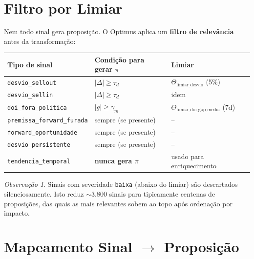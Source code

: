 \documentclass[a4paper, 12pt]{report}
\theoremstyle{definition}
\theoremstyle{remark}
\newtheorem{observacao}{Observa\c{c}\~ao}[chapter]
\begin{document}
\section{Filtro por Limiar}

Nem todo sinal gera proposi\c{c}\~ao. O Optimus aplica um
\textbf{filtro de relev\^ancia} antes da transforma\c{c}\~ao:

\begin{center}
\begin{tabular}{lll}
  \toprule
  \textbf{Tipo de sinal} & \textbf{Condi\c{c}\~ao para gerar $\pi$} & \textbf{Limiar} \\
  \midrule
  \texttt{desvio\_sellout} & $|\Delta| \geq \tau_d$ & $\Theta_{\text{limiar\_desvio}}$ (5\%) \\
  \texttt{desvio\_sellin} & $|\Delta| \geq \tau_d$ & idem \\
  \texttt{doi\_fora\_politica} & $|g| \geq \gamma_m$ & $\Theta_{\text{limiar\_doi\_gap\_media}}$ (7d) \\
  \texttt{premissa\_forward\_furada} & sempre (se presente) & -- \\
  \texttt{forward\_oportunidade} & sempre (se presente) & -- \\
  \texttt{desvio\_persistente} & sempre (se presente) & -- \\
  \texttt{tendencia\_temporal} & \textbf{nunca gera $\pi$} & usado para enriquecimento \\
  \bottomrule
\end{tabular}
\end{center}

\begin{observacao}
  Sinais com severidade \texttt{baixa} (abaixo do limiar) s\~ao descartados
  silenciosamente. Isto reduz $\sim$3.800 sinais para tipicamente
  centenas de proposi\c{c}\~oes, das quais as mais relevantes sobem
  ao topo ap\'os ordena\c{c}\~ao por impacto.
\end{observacao}


\section{Mapeamento Sinal $\to$ Proposi\c{c}\~ao}
\end{document}
